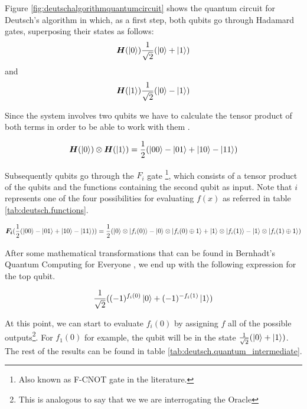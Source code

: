\documentclass[12pt,a4paper]{scrartcl}
\newcommand{\tens}[1]{%
  \mathbin{\mathop{\otimes}\displaylimits_{#1}}%
}
\begin{document}
Figure \ref{fig:deutschalgorithmquantumcircuit} shows the quantum circuit for Deutsch's algorithm in which, as a first step, both qubits go through Hadamard gates, superposing their states as follows:
\[ \boldsymbol{H}(\ket{0}) \frac{1}{\sqrt{2}}(\ket{0} + \ket{1}) \] and
\[ \boldsymbol{H}(\ket{1}) \frac{1}{\sqrt{2}}(\ket{0} - \ket{1}) \]

Since the system involves two qubits we have to calculate the tensor product of both terms in order to be able to work with them \cite{bernhardt2019quantum}.

\[ \boldsymbol{H}(\ket{0}) \tens{} \boldsymbol{H}(\ket{1}) = \frac{1}{2}(\ket{00} - \ket{01} + \ket{10} - \ket{11}) \]

Subsequently qubits go through the $F_i$ gate \footnote{Also known as F-CNOT gate in the literature.}, which consists of a tensor product of the qubits and the functions containing the second qubit as input. Note that  $i$ represents one of the four possibilities for evaluating $f(x)$ as referred in table \ref{tab:deutsch.functions}.

\begin{equation}
    \boldsymbol{F_i}(\frac{1}{2}(\ket{00} - \ket{01} + \ket{10} - \ket{11})) =  \frac{1}{2}(\ket{0}\tens{}\ket{f_i(0)}-\ket{0}\tens{}\ket{f_i(0)\oplus{1}}+\ket{1}\tens{}\ket{f_i(1)}-\ket{1}\tens{}\ket{f_i(1)\oplus{1}})
\end{equation}

After some mathematical transformations that can be found in Bernhadt's Quantum Computing for Everyone \cite{bernhardt2019quantum}, we end up with the following expression for the top qubit.

\begin{equation}
    \frac{1}{\sqrt{2}}((-1)^{f_i(0)}\ket{0}+(-1)^{-f_i(1)}\ket{1})
\end{equation}

At this point, we can start to evaluate $f_i(0)$ by assigning $f$ all of the possible outputs\footnote{This is analogous to say that we we are interrogating the Oracle}. For $f_1(0)$ for example, the qubit will be in the state $\frac{1}{\sqrt{2}}(\ket{0} + \ket{1})$. The rest of the results can be found in table \ref{tab:deutsch.quantum_intermediate}.
\end{document}
